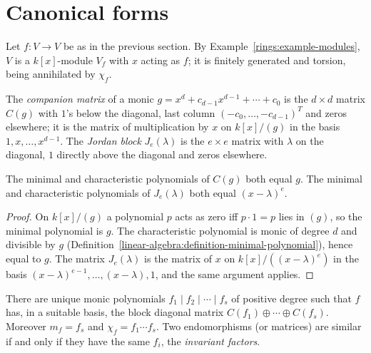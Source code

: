 \section{Canonical forms}\label{linear-algebra:section-canonical-forms}

Let $f \colon V \to V$ be as in the previous section. By Example~\ref{rings:example-modules}, $V$ is a
$k[x]$-module $V_f$ with $x$ acting as $f$; it is finitely generated and torsion, being annihilated by
$\chi_f$.

\begin{definition}\label{linear-algebra:definition-companion}
The \emph{companion matrix} of a monic $g = x^d + c_{d-1}x^{d-1} + \cdots + c_0$ is the $d \times d$ matrix $C(g)$
with $1$'s below the diagonal, last column $(-c_0, \ldots, -c_{d-1})^T$ and zeros elsewhere; it is the
matrix of multiplication by $x$ on $k[x]/(g)$ in the basis $1, x, \ldots, x^{d-1}$. The \emph{Jordan block}
$J_e(\lambda)$ is the $e \times e$ matrix with $\lambda$ on the diagonal, $1$ directly above the diagonal and zeros
elsewhere.
\end{definition}

\begin{lemma}\label{linear-algebra:lemma-companion}
The minimal and characteristic polynomials of $C(g)$ both equal $g$. The minimal and characteristic
polynomials of $J_e(\lambda)$ both equal $(x - \lambda)^e$.
\end{lemma}

\begin{proof}
On $k[x]/(g)$ a polynomial $p$ acts as zero iff $p \cdot 1 = p$ lies in $(g)$, so the minimal polynomial is
$g$. The characteristic polynomial is monic of degree $d$ and divisible by $g$
(Definition~\ref{linear-algebra:definition-minimal-polynomial}), hence equal to $g$. The matrix
$J_e(\lambda)$ is the matrix of $x$ on $k[x]/((x - \lambda)^e)$ in the basis
$(x - \lambda)^{e-1}, \ldots, (x - \lambda), 1$, and the same argument applies.
\end{proof}

\begin{theorem}\label{linear-algebra:theorem-rational-canonical-form}
There are unique monic polynomials $f_1 \mid f_2 \mid \cdots \mid f_s$ of positive degree such that $f$ has, in
a suitable basis, the block diagonal matrix $C(f_1) \oplus \cdots \oplus C(f_s)$. Moreover $m_f = f_s$ and
$\chi_f = f_1 \cdots f_s$. Two endomorphisms (or matrices) are similar if and only if they have the same
$f_i$, the \emph{invariant factors}.
\end{theorem}


